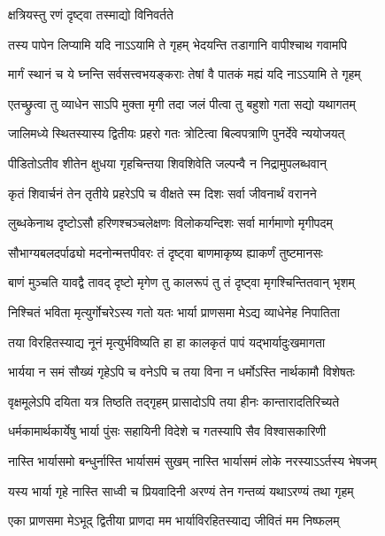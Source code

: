 

\onelineshloka
{क्षत्रियस्तु रणं दृष्ट्वा तस्माद्यो विनिवर्तते}%

\twolineshloka
{तस्य पापेन लिप्यामि यदि नाऽऽयामि ते गृहम्}
{भेदयन्ति तडागानि वापीश्चाथ गवामपि}%

\twolineshloka
{मार्गं स्थानं च ये घ्नन्ति सर्वसत्त्वभयङ्कराः}
{तेषां वै पातकं मह्यं यदि नाऽऽयामि ते गृहम्}%

\twolineshloka
{एतच्छ्रुत्वा तु व्याधेन साऽपि मुक्ता मृगी तदा}
{जलं पीत्वा तु बहुशो गता सद्यो यथागतम्}%

\twolineshloka
{जालिमध्ये स्थितस्यास्य द्वितीयः प्रहरो गतः}
{त्रोटित्वा बिल्वपत्राणि पुनर्देवे न्ययोजयत्}%

\twolineshloka
{पीडितोऽतीव शीतेन क्षुधया गृहचिन्तया}
{शिवशिवेति जल्पन्वै न निद्रामुपलब्धवान्}%

\twolineshloka
{कृतं शिवार्चनं तेन तृतीये प्रहरेऽपि च}
{वीक्षते स्म दिशः सर्वा जीवनार्थं वरानने}%

\twolineshloka
{लुब्धकेनाथ दृष्टोऽसौ हरिणश्चञ्चलेक्षणः}
{विलोकयन्दिशः सर्वा मार्गमाणो मृगीपदम्}%

\twolineshloka
{सौभाग्यबलदर्पाढ्यो मदनोन्मत्तपीवरः}
{तं दृष्ट्वा बाणमाकृष्य ह्याकर्णं तुष्टमानसः}%

\twolineshloka
{बाणं मुञ्चति यावद्वै तावद् दृष्टो मृगेण तु}
{कालरूपं तु तं दृष्ट्वा मृगश्चिन्तितवान् भृशम्}%

\twolineshloka
{निश्चितं भविता मृत्युर्गोचरेऽस्य गतो यतः}
{भार्या प्राणसमा मेऽद्य व्याधेनेह निपातिता}%

\twolineshloka
{तया विरहितस्याद्य नूनं मृत्युर्भविष्यति}
{हा हा कालकृतं पापं यद्भार्यादुःखमागता}%

\twolineshloka
{भार्यया न समं सौख्यं गृहेऽपि च वनेऽपि च}
{तया विना न धर्मोऽस्ति नार्थकामौ विशेषतः}%

\twolineshloka
{वृक्षमूलेऽपि दयिता यत्र तिष्ठति तद्गृहम्}
{प्रासादोऽपि तया हीनः कान्तारादतिरिच्यते}%

\twolineshloka
{धर्मकामार्थकार्येषु भार्या पुंसः सहायिनी}
{विदेशे च गतस्यापि सैव विश्वासकारिणी}%

\twolineshloka
{नास्ति भार्यासमो बन्धुर्नास्ति भार्यासमं सुखम्}
{नास्ति भार्यासमं लोके नरस्याऽऽर्तस्य भेषजम्}%

\twolineshloka
{यस्य भार्या गृहे नास्ति साध्वी च प्रियवादिनी}
{अरण्यं तेन गन्तव्यं यथाऽरण्यं तथा गृहम्}%

\twolineshloka
{एका प्राणसमा मेऽभूद् द्वितीया प्राणदा मम}
{भार्याविरहितस्याद्य जीवितं मम निष्फलम्}%

